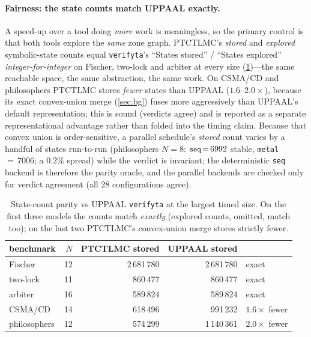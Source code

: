 \documentclass[11pt]{article}
\newcommand{\code}[1]{\texttt{\small #1}}
\begin{document}
\paragraph{Fairness: the state counts match UPPAAL exactly.} A speed-up over a tool doing \emph{more}
work is meaningless, so the primary control is that both tools explore the \emph{same} zone graph.
PTCTLMC's \emph{stored} and \emph{explored} symbolic-state counts equal \code{verifyta}'s
``States stored'' / ``States explored'' \emph{integer-for-integer} on Fischer, two-lock and arbiter
at every size (\cref{tab:parity})---the same reachable space, the same abstraction, the same work.
On CSMA/CD and philosophers PTCTLMC stores \emph{fewer} states than UPPAAL ($1.6$--$2.0\times$),
because its exact convex-union merge (\cref{sec:bg}) fuses more aggressively than UPPAAL's default
representation; this is sound (verdicts agree) and is reported as a separate representational
advantage rather than folded into the timing claim. Because that convex union is order-sensitive, a
parallel schedule's \emph{stored} count varies by a handful of states run-to-run (philosophers
$N{=}8$: $\code{seq}\,{=}\,6992$ stable, \code{metal}\,${=}\,7006$; a $0.2\%$ spread) while the
verdict is invariant; the deterministic \code{seq} backend is therefore the parity oracle, and the
parallel backends are checked only for verdict agreement (all $28$ configurations agree).

\begin{table}[t]
\centering\small
\caption{State-count parity vs UPPAAL \code{verifyta} at the largest timed size. On the first three
models the counts match \emph{exactly} (explored counts, omitted, match too); on the last two
PTCTLMC's convex-union merge stores strictly fewer.}
\label{tab:parity}
\begin{tabular}{l r r r l}
\toprule
benchmark & $N$ & PTCTLMC stored & UPPAAL stored & \\
\midrule
Fischer      & 12 & 2\,681\,780 & 2\,681\,780 & exact \\
two-lock     & 11 &   860\,477 &   860\,477 & exact \\
arbiter      & 16 &   589\,824 &   589\,824 & exact \\
CSMA/CD      & 14 &   618\,496 &   991\,232 & $1.6\times$ fewer \\
philosophers & 12 &   574\,299 & 1\,140\,361 & $2.0\times$ fewer \\
\bottomrule
\end{tabular}
\end{table}
\end{document}
